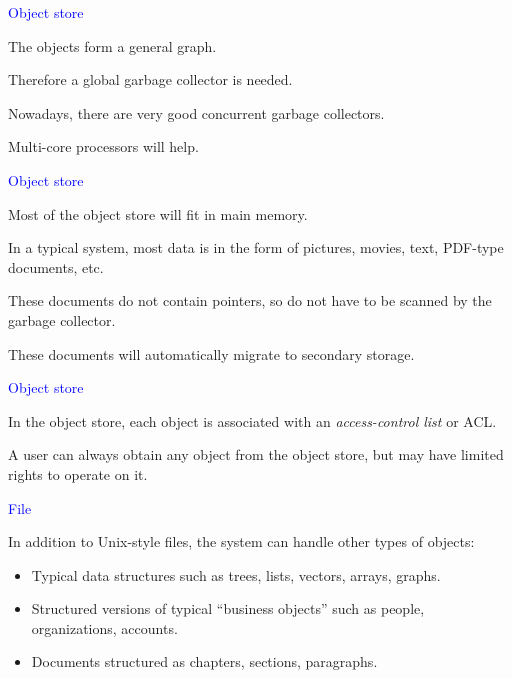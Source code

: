 \documentclass{slides}
\newcommand{\ti}[1]{\begin{center}\Large{\textcolor{blue}{#1}}\end{center}}
\begin{document}
\begin{slide}\ti{Object store}

The objects form a general graph.

Therefore a global garbage collector is needed.

Nowadays, there are very good concurrent garbage collectors.

Multi-core processors will help.

\vfill\end{slide}
\begin{slide}\ti{Object store}

Most of the object store will fit in main memory.

In a typical system, most data is in the form of pictures, movies,
text, PDF-type documents, etc.

These documents do not contain pointers, so do not have to be scanned
by the garbage collector.

These documents will automatically migrate to secondary storage.

\vfill\end{slide}
\begin{slide}\ti{Object store}

In the object store, each object is associated with an
\emph{access-control list} or ACL.

A user can always obtain any object from the object store, but may
have limited rights to operate on it.

\vfill\end{slide}
\begin{slide}\ti{File}

In addition to Unix-style files, the system can handle other types of
objects:

\begin{itemize}
\item Typical data structures such as trees, lists, vectors, arrays,
  graphs.
\item Structured versions of typical ``business objects'' such as
  people, organizations, accounts.
\item Documents structured as chapters, sections, paragraphs.
\end{itemize}

\vfill\end{slide}
\end{document}
